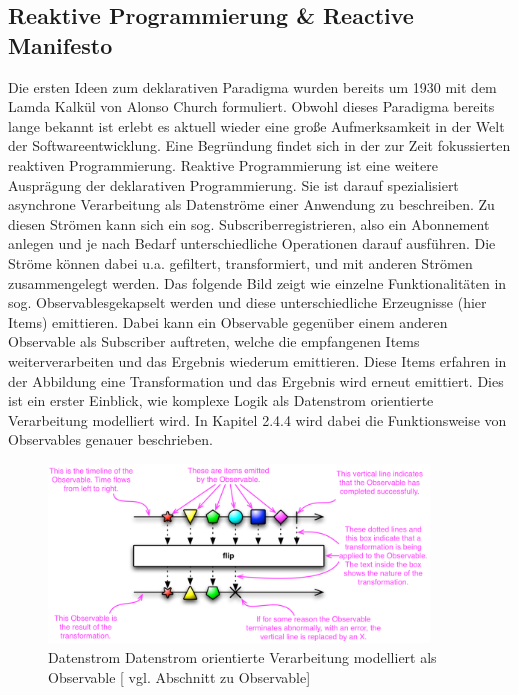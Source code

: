 \documentclass[12pt,oneside,a4paper,bibtotoc,liststotoc]{scrreprt}
\begin{document}
\subsection{Reaktive Programmierung \& Reactive Manifesto}
Die ersten Ideen zum deklarativen Paradigma wurden bereits um 1930 mit dem Lamda Kalkül von Alonso Church formuliert. Obwohl dieses Paradigma bereits lange bekannt ist erlebt es aktuell wieder eine große Aufmerksamkeit in der Welt der Softwareentwicklung. Eine Begründung findet sich in der zur Zeit fokussierten reaktiven Programmierung. Reaktive Programmierung ist eine weitere Ausprägung der deklarativen Programmierung. Sie ist darauf spezialisiert asynchrone Verarbeitung als Datenströme einer Anwendung zu beschreiben. Zu diesen Strömen kann sich ein sog. \glqq Subscriber\grqq registrieren, also ein Abonnement anlegen und je nach Bedarf unterschiedliche Operationen darauf ausführen. Die Ströme können dabei u.a. gefiltert, transformiert, und mit anderen Strömen zusammengelegt werden. Das folgende Bild zeigt wie einzelne Funktionalitäten in sog. \glqq Observables\grqq gekapselt werden und diese unterschiedliche Erzeugnisse (hier Items) emittieren. Dabei kann ein Observable gegenüber einem anderen Observable als Subscriber auftreten, welche die empfangenen Items weiterverarbeiten und das Ergebnis wiederum emittieren. Diese Items erfahren in der Abbildung eine Transformation und das Ergebnis wird erneut emittiert. Dies ist ein erster Einblick, wie komplexe Logik als Datenstrom orientierte Verarbeitung modelliert wird. In Kapitel 2.4.4 wird dabei die Funktionsweise von Observables genauer beschrieben.
\begin{figure}[H]
  \begin{centering}
    \includegraphics[width=0.9\textwidth]{img/Observable.png}
    \caption{Datenstrom Datenstrom orientierte Verarbeitung modelliert als Observable [\citet {rxAllgDoku} vgl. Abschnitt zu Observable] }
    \label{Observable}
  \end{centering}
\end{figure}
\end{document}
